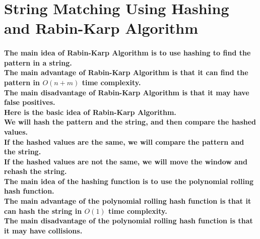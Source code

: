 \documentclass{article}
\begin{document}
\section{String Matching Using Hashing and Rabin-Karp Algorithm}

\paragraph{
    The main idea of Rabin-Karp Algorithm is to use hashing to find the pattern in a string.\\
    The main advantage of Rabin-Karp Algorithm is that it can find the pattern in $O(n+m)$ time complexity.\\
    The main disadvantage of Rabin-Karp Algorithm is that it may have false positives.\\
    Here is the basic idea of Rabin-Karp Algorithm.\\
    We will hash the pattern and the string, and then compare the hashed values.\\
    If the hashed values are the same, we will compare the pattern and the string.\\
    If the hashed values are not the same, we will move the window and rehash the string.\\
    The main idea of the hashing function is to use the polynomial rolling hash function.\\
    The main advantage of the polynomial rolling hash function is that it can hash the string in $O(1)$ time complexity.\\
    The main disadvantage of the polynomial rolling hash function is that it may have collisions.\\
}
\end{document}
